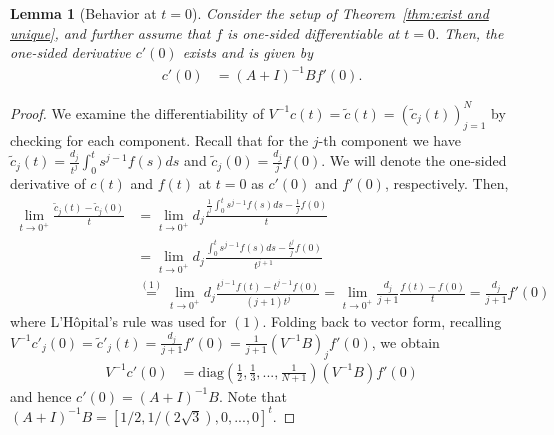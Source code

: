 \documentclass{article}
\newtheorem{lemma}{Lemma}
\theoremstyle{definition}
\newcommand{\pr}[1]{ \left( #1 \right) }
\begin{document}
\begin{lemma} [Behavior at $t=0$] \label{lem:t=0 calc}
Consider the setup of Theorem~\ref{thm:exist and unique}, and further assume that $f$ is one-sided differentiable at $t=0$.
Then, the one-sided derivative $c'(0)$ exists and is given by
        \begin{align}
        c'(0) 
        &= (A+I)^{-1}B f'(0).\label{eq:c'(0)}
    \end{align}
\end{lemma}
\begin{proof}    
We examine the differentiability of $V^{-1}c(t) = \tilde{c}(t) = (\tilde{c}_j(t))_{j=1}^N$ by checking for each component. Recall that for the $j$-th component we have $\tilde{c}_j(t) = \frac{d_j}{t^j}\int_0^t s^{j-1}f(s)ds$ and $\tilde{c}_j(0) = \frac{d_j}{j}f(0)$. 
We will denote the one-sided derivative of $c(t)$ and $f(t)$ at $t=0$ as $c'(0)$ and $f'(0)$, respectively. 
Then,
\begin{align*}
    \lim_{t \to 0^+} \frac{\tilde{c}
_j(t) - \tilde{c}_j(0)}{t} 
    &= \lim_{t \to 0^+} d_j \frac{\frac{1}{t^j} \int_0^t s^{j-1} f(s)ds - \frac{1}{j}f(0)}{t} \\
    &= \lim_{t \to 0^+} d_j \frac{\int_0^t s^{j-1} f(s)ds - \frac{t^j}{j}f(0)}{t^{j+1}} \\
    &\overset{(1)}{=} \lim_{t \to 0^+} d_j \frac{t^{j-1}f(t) - t^{j-1} f(0)}{(j+1)t^{j}} %
    = \lim_{t \to 0^+} \frac{d_j}{j+1} \frac{f(t) - f(0)}{t} %
    = \frac{d_j}{j+1} f'(0)
\end{align*}
where L'H\^{o}pital's rule was used for $(1)$. 
 Folding back to vector form, recalling $V^{-1}c'_j(0) = \tilde{c}'_j(t) = \frac{d_j}{j+1}f'(0) = \frac{1}{j+1}(V^{-1}B)_j f'(0)$, we obtain
    \begin{align*}
        V^{-1}c'(0) 
        &=  \text{diag} \pr{ \frac{1}{2}, \frac{1}{3}, ... , \frac{1}{N+1} } %
        (V^{-1}B) f'(0) 
    \end{align*}
and hence $c'(0) = \pr{A+I}^{-1}B$. 
Note that $(A+I)^{-1}B = [1/2, 1/(2\sqrt{3}), 0, ..., 0]^{t}$.
\end{proof}



\end{document}
